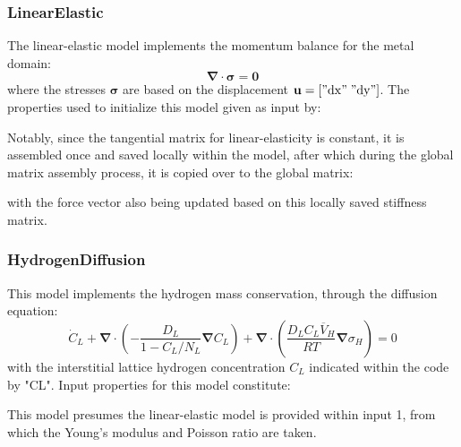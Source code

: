 \documentclass[3p]{elsarticle} %
\begin{document}
\subsubsection{LinearElastic}
The linear-elastic model implements the momentum balance for the metal domain:
\begin{equation}
	\bm{\nabla}\cdot\bm{\sigma} = \mathbf{0}
\end{equation}
where the stresses $\bm{\sigma}$ are based on the displacement $\mathbf{u}=["\mathrm{dx}"\;"\mathrm{dy}"]$. The properties used to initialize this model given as input by:

Notably, since the tangential matrix for linear-elasticity is constant, it is assembled once and saved locally within the model, after which during the global matrix assembly process, it is copied over to the global matrix:

with the force vector also being updated based on this locally saved stiffness matrix. 

\subsubsection{HydrogenDiffusion}
This model implements the hydrogen mass conservation, through the diffusion equation:
\begin{equation}
    \dot{C}_L + \bm{\nabla}\cdot\left(-\frac{D_L}{1-C_L/N_L} \bm{\nabla}C_L \right) + \bm{\nabla}\cdot\left(\frac{D_L C_L \overline{V}_H}{RT}\bm{\nabla}\sigma_H\right) = 0
\end{equation}
with the interstitial lattice hydrogen concentration $C_L$ indicated within the code by "CL". Input properties for this model constitute:

This model presumes the linear-elastic model is provided within input 1, from which the Young's modulus and Poisson ratio are taken.
\end{document}
